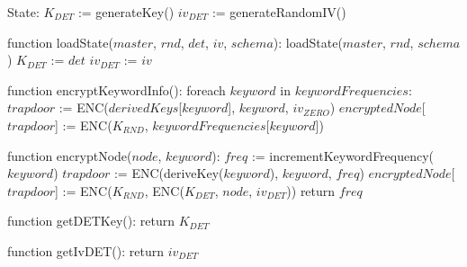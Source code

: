 State:
    $K_{DET}$ := generateKey()
    $iv_{DET}$ := generateRandomIV()

function loadState($master$, $rnd$, $det$, $iv$, $schema$):
    loadState($master$, $rnd$, $schema$)
    $K_{DET}$ := $det$
    $iv_{DET}$ := $iv$

function encryptKeywordInfo():
    foreach $keyword$ in $keywordFrequencies$:
        $trapdoor$ := ENC($derivedKeys$[$keyword$], $keyword$, $iv_{ZERO}$)
        $encryptedNode$[$trapdoor$] := ENC($K_{RND}$, $keywordFrequencies$[$keyword$])

function encryptNode($node$, $keyword$):
    $freq$ := incrementKeywordFrequency($keyword$)
    $trapdoor$ := ENC(deriveKey($keyword$), $keyword$, $freq$)
    $encryptedNode$[$trapdoor$] := ENC($K_{RND}$, ENC($K_{DET}$, $node$, $iv_{DET}$))
    return $freq$
 
function getDETKey():
    return $K_{DET}$

function getIvDET():
    return $iv_{DET}$
